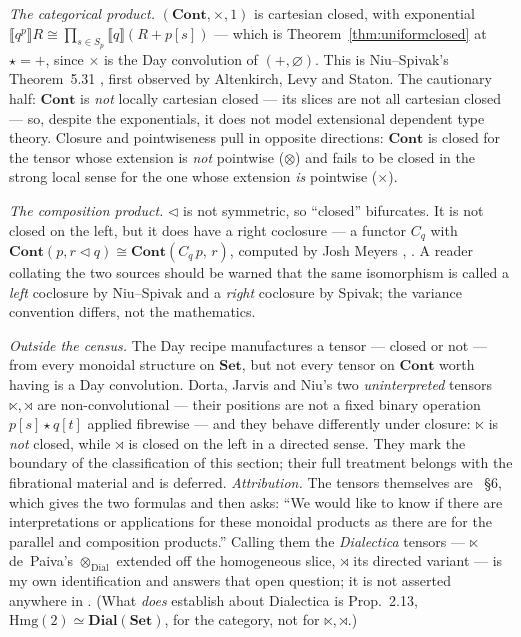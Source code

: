 \documentclass[11pt,a4paper]{book}
\newcommand{\Set}{\mathbf{Set}}
\newcommand{\Cont}{\mathbf{Cont}}
\newcommand{\cont}[2]{#1 \triangleleft #2}
\newcommand{\Ext}[1]{\llbracket #1 \rrbracket}
\theoremstyle{plain}
\theoremstyle{definition}
\theoremstyle{remark}
\begin{document}
\emph{The categorical product.} $(\Cont,\times,1)$ is cartesian closed, with
exponential $\Ext{q^p}R\cong\prod_{s\in S_p}\Ext q{(R+p[s])}$ --- which is
Theorem~\ref{thm:uniformclosed} at $\star=+$, since $\times$ is the Day convolution
of $(+,\varnothing)$. This is Niu--Spivak's Theorem~5.31 \cite{NiuSpivak23}, first
observed by Altenkirch, Levy and Staton. The cautionary half: $\Cont$ is
\emph{not} locally cartesian closed --- its slices are not all cartesian closed ---
so, despite the exponentials, it does not model extensional dependent type theory.
Closure and pointwiseness pull in opposite directions: $\Cont$ is closed for the
tensor whose extension is \emph{not} pointwise ($\otimes$) and fails to be closed
in the strong local sense for the one whose extension \emph{is} pointwise
($\times$).

\emph{The composition product.} $\triangleleft$ is not symmetric, so ``closed''
bifurcates. It is not closed on the left, but it does have a right coclosure ---
a functor $C_q$ with $\Cont(p,\cont rq)\cong\Cont(C_q\,p,\,r)$, computed by Josh
Meyers \cite[eqs.~(68)--(69)]{SpivakRef}, \cite[Prop.~6.57]{NiuSpivak23}. A reader
collating the two sources should be warned that the same isomorphism is called a
\emph{left} coclosure by Niu--Spivak and a \emph{right} coclosure by Spivak; the
variance convention differs, not the mathematics.

\emph{Outside the census.} The Day recipe manufactures a tensor --- closed or not
--- from every monoidal structure on $\Set$, but not every tensor on $\Cont$ worth
having is a Day convolution. Dorta, Jarvis and Niu's two \emph{uninterpreted}
tensors $\ltimes,\rtimes$ \cite{DJN} are non-convolutional --- their positions are not a
fixed binary operation $p[s]\star q[t]$ applied fibrewise --- and they behave
differently under closure:
$\ltimes$ is \emph{not} closed, while $\rtimes$ is closed on the left in a directed
sense. They mark the boundary of the classification of this section; their full
treatment belongs with the fibrational material and is deferred.
\emph{Attribution.} The tensors themselves are \cite{DJN}~\S6, which gives the
two formulas and then asks: ``We would like to know if there are interpretations
or applications for these monoidal products as there are for the parallel and
composition products.'' Calling them the \emph{Dialectica} tensors ---
$\ltimes$ de~Paiva's $\otimes_{\mathrm{Dial}}$ extended off the homogeneous
slice, $\rtimes$ its directed variant --- is my own identification and answers
that open question; it is not asserted anywhere in \cite{DJN}. (What
\cite{DJN} \emph{does} establish about Dialectica is Prop.~2.13,
$\mathrm{Hmg}(2)\simeq\mathbf{Dial}(\mathbf{Set})$, for the category, not for
$\ltimes,\rtimes$.)
\end{document}
